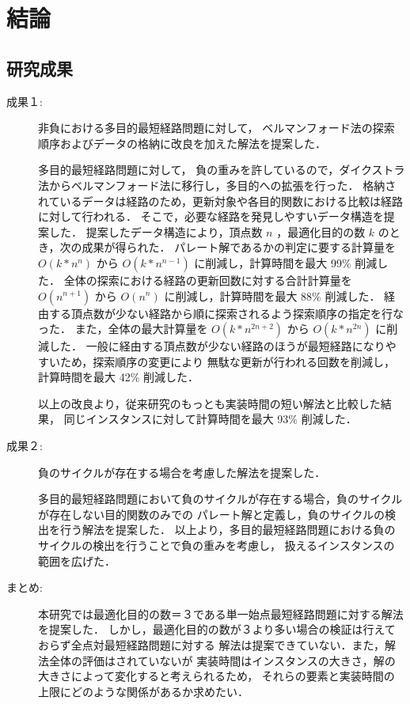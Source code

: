 \documentclass[12pt]{optlab-bachelor}
\begin{document}
\chapter{結論}

\section{研究成果}

\begin{description}
  \item[成果１:]
  非負における多目的最短経路問題に対して，
  ベルマンフォード法の探索順序およびデータの格納に改良を加えた解法を提案した．

  多目的最短経路問題に対して，
  負の重みを許しているので，ダイクストラ法からベルマンフォード法に移行し，多目的への拡張を行った．
  格納されているデータは経路のため，更新対象や各目的関数における比較は経路に対して行われる．
  そこで，必要な経路を発見しやすいデータ構造を提案した．
  提案したデータ構造により，頂点数 $n$ ，最適化目的の数 $k$ のとき，次の成果が得られた．
  パレート解であるかの判定に要する計算量を $O(k*n^n)$ から $O(k*n^{n-1})$ に削減し，計算時間を最大 99\% 削減した．
  全体の探索における経路の更新回数に対する合計計算量を $O(n^{n+1})$ から $O(n^n)$ に削減し，計算時間を最大 88\% 削減した．
  経由する頂点数が少ない経路から順に探索されるよう探索順序の指定を行なった．
  また，全体の最大計算量を $O(k*n^{2n+2})$ から $O(k*n^{2n})$ に削減した．
  一般に経由する頂点数が少ない経路のほうが最短経路になりやすいため，探索順序の変更により
  無駄な更新が行われる回数を削減し，計算時間を最大 42\% 削減した．

  以上の改良より，従来研究のもっとも実装時間の短い解法と比較した結果，
  同じインスタンスに対して計算時間を最大 93\% 削減した．
\end{description}

\begin{description}
  \item[成果２:]
  負のサイクルが存在する場合を考慮した解法を提案した．

  多目的最短経路問題において負のサイクルが存在する場合，負のサイクルが存在しない目的関数のみでの
  パレート解と定義し，負のサイクルの検出を行う解法を提案した．
  以上より，多目的最短経路問題における負のサイクルの検出を行うことで負の重みを考慮し，
  扱えるインスタンスの範囲を広げた．
\end{description}

\begin{description}
  \item[まとめ:]
  本研究では最適化目的の数＝３である単一始点最短経路問題に対する解法を提案した．
  しかし，最適化目的の数が３より多い場合の検証は行えておらず全点対最短経路問題に対する
  解法は提案できていない．また，解法全体の評価はされていないが
  実装時間はインスタンスの大きさ，解の大きさによって変化すると考えられるため，
  それらの要素と実装時間の上限にどのような関係があるか求めたい．
\end{description}
\end{document}
